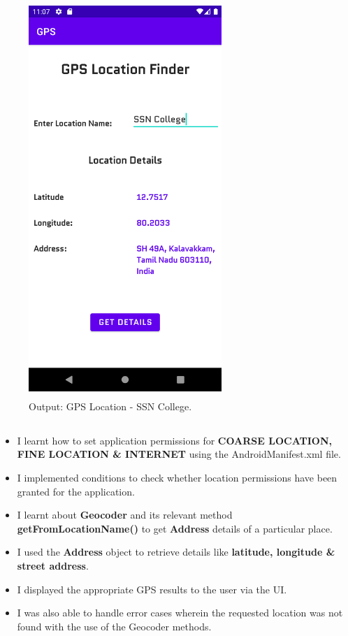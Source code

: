 \documentclass[12pt, a4]{article}
\begin{document}
\subsection*{}
\begin{figure}[h]
\centering
\caption{Output: GPS Location - SSN College.}
\includegraphics[height=15cm, width=7.3cm]{GPS/Screenshots/Output-2.png}
\end{figure}


\newpage
\subsection*{}
\begin{itemize}

\item I learnt how to set application permissions for 
\textbf{COARSE LOCATION, FINE LOCATION \& INTERNET} using the AndroidManifest.xml file.
\item I implemented conditions to check whether location permissions have been granted for the application.
\item I learnt about \textbf{Geocoder} and its relevant method \textbf{getFromLocationName()} to get \textbf{Address} details of a particular place.
\item I used the \textbf{Address} object to retrieve details like \textbf{latitude, longitude \& street address}.
\item I displayed the appropriate GPS results to the user via the UI. 
\item I was also able to handle error cases wherein the requested location was not found with the use of the Geocoder methods.

\end{itemize}
\end{document}
